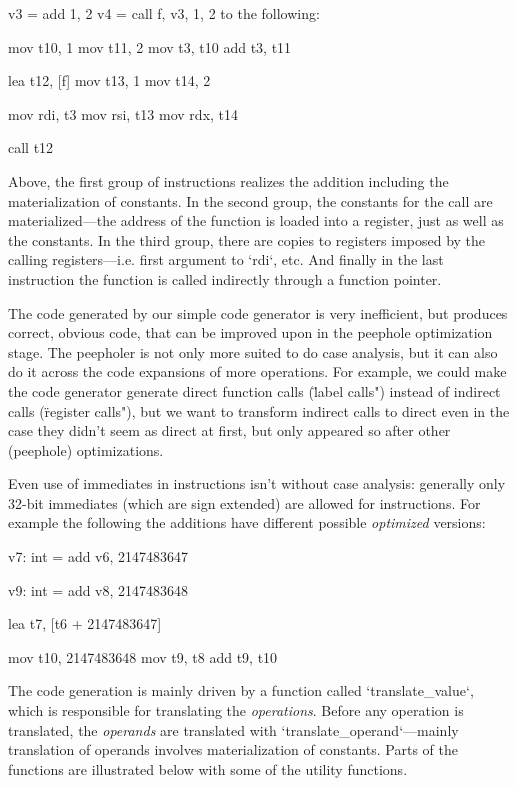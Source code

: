\begtt
v3 = add 1, 2
v4 = call f, v3, 1, 2
\endtt
%
to the following:

\begtt
mov t10, 1
mov t11, 2
mov t3, t10
add t3, t11

lea t12, [f]
mov t13, 1
mov t14, 2

mov rdi, t3
mov rsi, t13
mov rdx, t14

call t12
\endtt

Above, the first group of instructions realizes the addition including the
materialization of constants. In the second group, the constants for the call
are materialized---the address of the function is loaded into a register, just
as well as the constants. In the third group, there are copies to registers imposed by the
calling registers---i.e. first argument to `rdi`, etc. And finally in the last
instruction the function is called indirectly through a function pointer.

The code generated by our simple code generator is very inefficient, but
produces correct, obvious code, that can be improved upon in the peephole
optimization stage. The peepholer is not only more suited to do case analysis,
but it can also do it across the code expansions of more operations. For
example, we could make the code generator generate direct function calls
(\"label calls") instead of indirect calls (\"register calls"), but we want to
transform indirect calls to direct even in the case they didn't seem as direct
at first, but only appeared so after other (peephole) optimizations.

Even use of immediates in instructions isn't without case analysis: generally
only 32-bit immediates (which are sign extended) are allowed for instructions.
For example the following the additions have different possible {\em optimized}
versions:

\begtt
v7: int = add v6, 2147483647

v9: int = add v8, 2147483648
\endtt

\begtt
lea t7, [t6 + 2147483647]

mov t10, 2147483648
mov t9, t8
add t9, t10
\endtt

The code generation is mainly driven by a function called `translate_value`,
which is responsible for translating the {\em operations}. Before any operation
is translated, the {\em operands} are translated with
`translate_operand`---mainly translation of operands involves materialization of
constants. Parts of the functions are illustrated below with some of the utility
functions.

